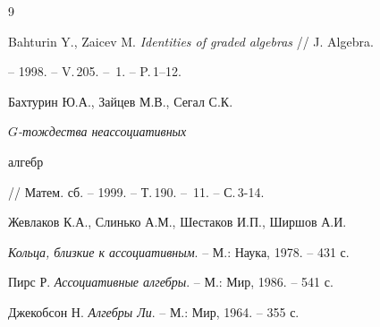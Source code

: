 \begin{thebibliography}{9} 


 




Bahturin Y., Zaicev M. {\em Identities of graded algebras} // J. Algebra. 


-- 1998. -- V.\,205. -- \No\,1. -- P.\,1--12.  




Бахтурин Ю.А., Зайцев М.В., Сегал С.К. {\em $G$-тождества неассоциативных 


алгебр} // Матем. сб. -- 1999. -- Т.\,190. -- \No\,11. -- С.\,3-14.  




Жевлаков К.А., Слинько А.М., Шестаков И.П., Ширшов А.И.  


{\em Кольца, близкие к ассоциативным}. -- М.: Наука, 1978. -- 431 с. 




Пирс Р. {\em Ассоциативные алгебры}. -- М.: Мир, 1986. -- 541 с. 




Джекобсон Н. {\em Алгебры Ли}. -- М.: Мир, 1964. -- 355 с. 


 


\end{thebibliography} 


 


\vskip 2cm 


 






 


\label{end} 


 


